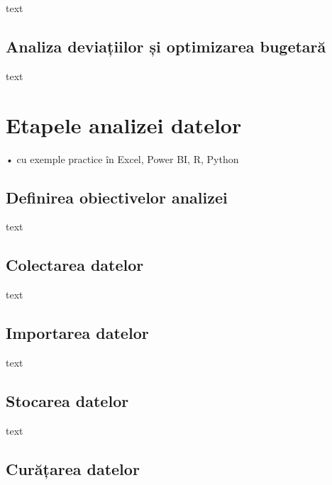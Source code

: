 \documentclass[
  11pt,
  b5paper,
  nottoc]{book}
\begin{document}
text

\hypertarget{analiza-deviaux21biilor-ux219i-optimizarea-bugetarux103}{%
\section{Analiza deviațiilor și optimizarea
bugetară}\label{analiza-deviaux21biilor-ux219i-optimizarea-bugetarux103}}

text


\hypertarget{cap5}{%
\chapter{Etapele analizei datelor}\label{cap5}}

• cu exemple practice în Excel, Power BI, R, Python

\hypertarget{definirea-obiectivelor-analizei}{%
\section{Definirea obiectivelor
analizei}\label{definirea-obiectivelor-analizei}}

text

\hypertarget{colectarea-datelor}{%
\section{Colectarea datelor}\label{colectarea-datelor}}

text

\hypertarget{importarea-datelor}{%
\section{Importarea datelor}\label{importarea-datelor}}

text

\hypertarget{stocarea-datelor}{%
\section{Stocarea datelor}\label{stocarea-datelor}}

text

\hypertarget{curux103ux21barea-datelor}{%
\section{Curățarea datelor}\label{curux103ux21barea-datelor}}
\end{document}
